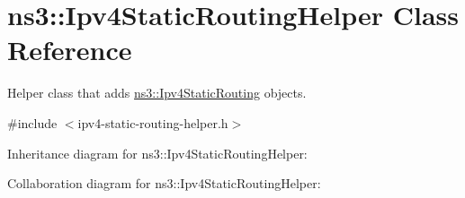 \hypertarget{classns3_1_1Ipv4StaticRoutingHelper}{}\section{ns3\+:\+:Ipv4\+Static\+Routing\+Helper Class Reference}
\label{classns3_1_1Ipv4StaticRoutingHelper}


Helper class that adds \hyperlink{classns3_1_1Ipv4StaticRouting}{ns3\+::\+Ipv4\+Static\+Routing} objects.  




{\ttfamily \#include $<$ipv4-\/static-\/routing-\/helper.\+h$>$}



Inheritance diagram for ns3\+:\+:Ipv4\+Static\+Routing\+Helper\+:


Collaboration diagram for ns3\+:\+:Ipv4\+Static\+Routing\+Helper\+:
